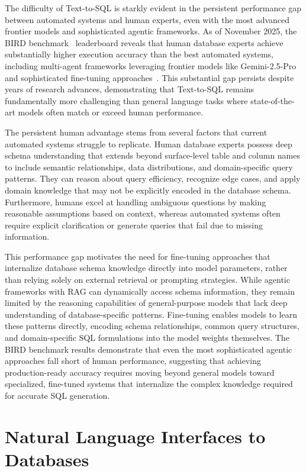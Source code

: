 The difficulty of Text-to-SQL is starkly evident in the persistent performance gap between automated systems and human experts, even with the most advanced frontier models and sophisticated agentic frameworks. As of November 2025, the BIRD benchmark~\cite{bird} leaderboard reveals that human database experts achieve substantially higher execution accuracy than the best automated systems, including multi-agent frameworks leveraging frontier models like Gemini-2.5-Pro and sophisticated fine-tuning approaches~\cite{bird-bench}. This substantial gap persists despite years of research advances, demonstrating that Text-to-SQL remains fundamentally more challenging than general language tasks where state-of-the-art models often match or exceed human performance.

The persistent human advantage stems from several factors that current automated systems struggle to replicate. Human database experts possess deep schema understanding that extends beyond surface-level table and column names to include semantic relationships, data distributions, and domain-specific query patterns. They can reason about query efficiency, recognize edge cases, and apply domain knowledge that may not be explicitly encoded in the database schema. Furthermore, humans excel at handling ambiguous questions by making reasonable assumptions based on context, whereas automated systems often require explicit clarification or generate queries that fail due to missing information.

This performance gap motivates the need for fine-tuning approaches that internalize database schema knowledge directly into model parameters, rather than relying solely on external retrieval or prompting strategies. While agentic frameworks with RAG can dynamically access schema information, they remain limited by the reasoning capabilities of general-purpose models that lack deep understanding of database-specific patterns. Fine-tuning enables models to learn these patterns directly, encoding schema relationships, common query structures, and domain-specific SQL formulations into the model weights themselves. The BIRD benchmark results demonstrate that even the most sophisticated agentic approaches fall short of human performance, suggesting that achieving production-ready accuracy requires moving beyond general models toward specialized, fine-tuned systems that internalize the complex knowledge required for accurate SQL generation.

\section{Natural Language Interfaces to Databases}

